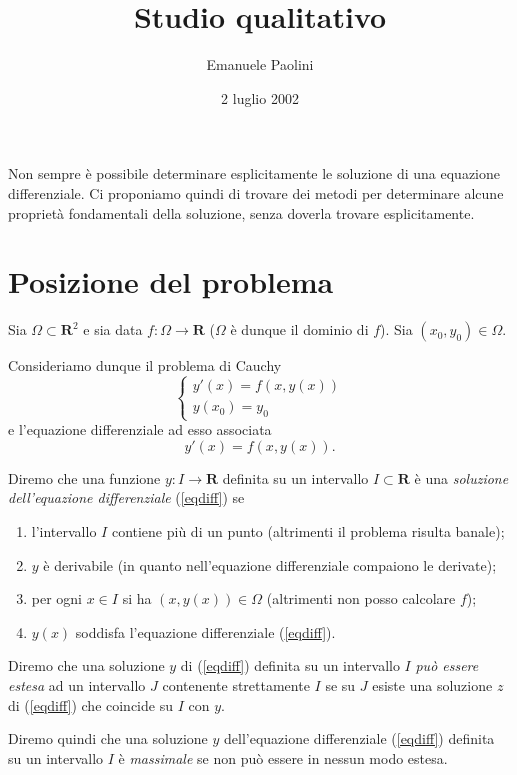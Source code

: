 \documentclass[italian,a4paper]{article}
\title{Studio qualitativo}
\author{Emanuele Paolini}
\date{2 luglio 2002}
\newcommand{\R}{\mathbf{R}}
\begin{document}
\maketitle
Non sempre \`e possibile determinare esplicitamente le soluzione
di una equazione differenziale. Ci proponiamo quindi di trovare dei metodi per
determinare alcune propriet\`a fondamentali della soluzione, senza
doverla trovare esplicitamente. 

\section{Posizione del problema}

Sia $\Omega\subset \R^2$ e sia data $f: \Omega\to\R$ ($\Omega$ \`e
dunque il dominio di $f$). 
Sia $(x_0,y_0)\in \Omega$. 

Consideriamo dunque il problema di Cauchy
\begin{equation}\label{cauchy}
        \left\{\begin{array}{l}
                y'(x) = f(x,y(x))\\
                y(x_0) = y_0
                \end{array}\right.
\end{equation}
e l'equazione differenziale ad esso associata
\begin{equation}\label{eqdiff}
	y'(x)= f(x,y(x)).
\end{equation}

Diremo che una funzione $y:I\to\R$ definita su un intervallo
$I\subset \R$ \`e una \emph{soluzione dell'equazione differenziale}
(\ref{eqdiff}) se 
\begin{enumerate}
\item l'intervallo $I$ contiene pi\`u di un punto (altrimenti il
  problema risulta banale);
\item $y$ \`e derivabile (in quanto nell'equazione differenziale
  compaiono le derivate);
\item per ogni $x\in I$ si ha $(x,y(x))\in \Omega$ (altrimenti
  non posso calcolare $f$);
\item  $y(x)$ soddisfa l'equazione differenziale (\ref{eqdiff}).
\end{enumerate}

Diremo che una soluzione $y$ di (\ref{eqdiff}) definita su un intervallo $I$
\emph{pu\`o essere estesa} ad un intervallo $J$ contenente
strettamente $I$ se su $J$ esiste una soluzione $z$ di (\ref{eqdiff}) che
coincide su $I$ con $y$.

Diremo quindi che una soluzione $y$ dell'equazione differenziale 
(\ref{eqdiff}) definita su un
intervallo $I$ \`e \emph{massimale} se non pu\`o essere in nessun modo
estesa.
\end{document}
